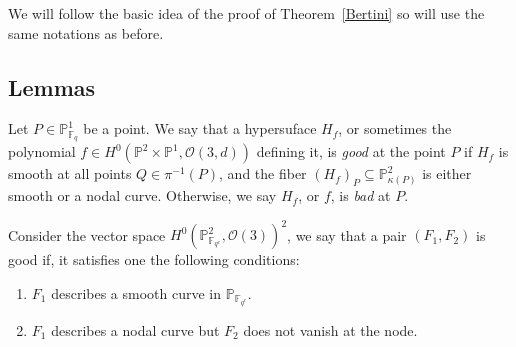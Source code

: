 \documentclass[12pt]{article}
\theoremstyle{plain}
\theoremstyle{definition}
\newcommand{\IF}{\mathbb{F}}
\newcommand{\IP}{\mathbb{P}}
\newcommand{\sO}{\mathcal{O}}
\newcommand{\<}{\langle}
\renewcommand{\>}{\rangle}
\begin{document}
We will follow the basic idea of the proof of Theorem~\ref{Bertini} so will use the same notations as before. 
\subsection{Lemmas}
Let $P \in \IP^1_{\IF_q}$ be a point. We say that a hypersuface $H_f$, or sometimes the polynomial $f \in H^0(\IP^2 \times \IP^1, \sO(3, d))$ defining it, is \textit{good} at the point $P$ if $H_f$ is smooth at all points $Q \in \pi^{-1}(P)$, and the fiber $(H_f)_P \subseteq \IP^2_{\kappa(P)}$ is either smooth or a nodal curve. Otherwise, we say $H_f$, or $f$, is \textit{bad} at $P$.  

Consider the vector space $H^0(\IP^2_{\IF_{q^e}}, \sO(3))^2$, we say that a pair $(F_1, F_2)$ is good if, it satisfies one the following conditions:
\begin{enumerate}
\item $F_1$ describes a smooth curve in $\IP_{\IF_{q^e}}$.
\item $F_1$ describes a nodal curve but $F_2$ does not vanish at the node.
\end{enumerate}  
\end{document}
